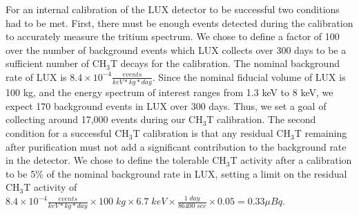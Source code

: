 For an internal calibration of the LUX detector to be successful two conditions had to be met.  First, there must be enough events detected during the calibration to accurately measure the tritium spectrum.  We chose to define a factor of 100 over the number of  background events which LUX collects over 300 days to be a sufficient number of CH$_3$T decays for the calibration.  The nominal background rate of LUX is $8.4 \times 10^{-4} \frac{events}{keV*kg*day}$.  Since the nominal fiducial volume of LUX is 100 kg, and the energy spectrum of interest ranges from 1.3 keV to 8 keV, we expect 170 background events in LUX over 300 days.  Thus, we set a goal of collecting around 17,000 events during our CH$_3$T calibration.  The second condition for a successful CH$_3$T calibration is that any residual CH$_3$T remaining after purification must not add a significant contribution to the background rate in the detector.  We chose to define the tolerable CH$_3$T activity after a calibration to be 5\% of the nominal background rate in LUX, setting a limit on the residual CH$_3$T activity of $8.4 \times 10^{-4} \frac{events}{keV*kg*day} \times 100 \; kg \times 6.7 \; keV \times \frac{1 \; day}{86400 \; sec} \times 0.05 = 0.33 \mu Bq$.